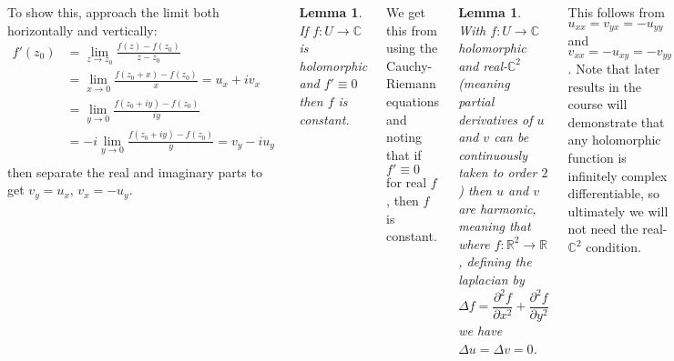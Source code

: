 \documentclass{tikzposter} %
\newtheorem{lemma}[theorem]{Lemma}
\begin{document}
\begin{columns}
{  To show this, approach the limit both horizontally and vertically:
  \begin{align*}
    f'(z_{0}) &= \lim_{z \to z_{0}}\frac{f(z)-f(z_{0})}{z-z_0} \\
              &= \lim_{x \to 0}\frac{f(z_{0}+x)-f(z_{0})}{x} = u_{x} + iv_{x} \\
              &= \lim_{y \to 0} \frac{f(z_{0} + iy) - f(z_{0})}{iy} \\
    &= -i \lim_{y \to 0}  \frac{f(z_{0} + iy) - f(z_{0})}{y} = v_{y} - iu_{y}\\
  \end{align*}
  then separate the real and imaginary parts to get $v_{y} = u_{x}$, $v_{x} = -u_{y}$. \\

  \hphantom{}

  \begin{lemma}
    If $f : U \to \mathbb{C}$ is holomorphic and $f' \equiv 0$ then $f$ is constant.
  \end{lemma}
  \hphantom{}

  We get this from using the Cauchy-Riemann equations and noting that if $f' \equiv 0$ for real $f$, then $f$ is constant. \\

  \begin{lemma}
    With $f : U \to \mathbb{C}$ holomorphic and real-$\mathbb{C}^{2}$ (meaning partial derivatives of $u$ and $v$ can be continuously taken to order $2$) then $u$ and $v$ are harmonic, meaning that where $f : \mathbb{R}^{2} \to \mathbb{R}$, defining the laplacian by
    \[
      \Delta f = \frac{\partial^{2} f}{\partial x^{2}} + \frac{\partial^{2} f}{\partial y^{2}}
    \]
    we have $\Delta u = \Delta v = 0$.
  \end{lemma}
  \hphantom{}

  This follows from $u_{xx} = v_{yx} = -u_{yy}$ and $v_{xx} = -u_{xy} = -v_{yy}$. Note that later results in the course will demonstrate that any holomorphic function is infinitely complex differentiable, so ultimately we will not need the real-$\mathbb{C}^{2}$ condition.
}


\end{columns}
\end{document}
